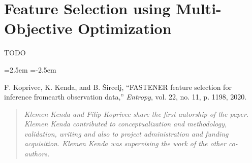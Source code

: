 % 
\chapter{Feature Selection using Multi-Objective Optimization}
\label{ch:feature-selection}

TODO

\begin{list}{}
{\leftmargin=2.5em \itemindent=-2.5em}
    \item F. Koprivec, K. Kenda, and B. Šircelj, “FASTENER feature selection for inference fromearth observation data,” \textit{Entropy}, vol. 22, no. 11, p. 1198, 2020.
\end{list}

\begin{quote}
    \textit{Klemen Kenda and Filip Koprivec share the first autorship of the paper.
    Klemen Kenda contributed to conceptualization and methodology, validation, writing and also to project administration and funding acquisition. 
    Klemen Kenda was supervising the work of the other co-authors.}
\end{quote}





